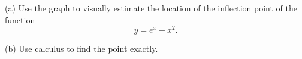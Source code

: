 (a) Use the graph to visually estimate the location of the inflection point
of the function
\begin{equation*}
  y = e^x-x^2.
\end{equation*}

(b) Use calculus to find the point exactly.
\answercheck
